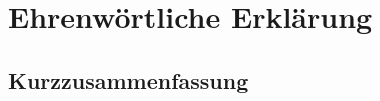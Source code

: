 \documentclass[longdoc,accentcolor=tud1b,11pt,paper=a4]{tudreport}
\title{\fzdTitle}
\subtitle{\fzdThesisType \fzdID}
\newcounter{dummy} %
\begin{document}
	\frenchspacing
	\raggedbottom
	\maketitle
	
	\chapter*{Ehrenw\"{o}rtliche Erkl\"{a}rung}
	
	\newpage	
	
	\section*{Kurzzusammenfassung}
	
	\tableofcontents
	\cleardoublepage
    


	
\end{document}
